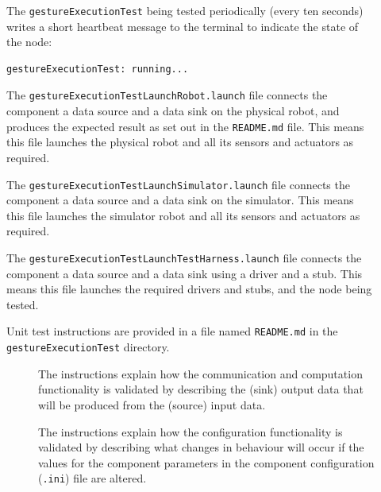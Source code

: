 \documentclass{CSSRforAfrica}
\newcommand{\checkboxChecked}{\fbox{\ding{51}}} %
\newcommand{\checkboxDashed}{\fbox{--}}         %
\begin{document}
\begin{description}
\item[\checkboxChecked]  The {\small \verb+gestureExecutionTest+} being tested periodically (every ten seconds) writes a short heartbeat message to
 the terminal to indicate the state of the node:
\begin{verbatim}
gestureExecutionTest: running...
\end{verbatim}

\item[\checkboxChecked] The {\small \verb+gestureExecutionTestLaunchRobot.launch+} file  connects the component a data source and a data sink on the physical robot, and produces the expected result as set out in the  {\small \verb+README.md+}  file.    This means this file launches the physical robot and all its sensors and actuators as required.

\item[\checkboxDashed] The {\small \verb+gestureExecutionTestLaunchSimulator.launch+} file  connects the component a data source and a data sink on the simulator.   This means this file launches the simulator robot and all its sensors and actuators as required.

\item[\checkboxChecked] The {\small \verb+gestureExecutionTestLaunchTestHarness.launch+} file  connects the component a data source and a data sink using a driver and a stub.   This means this file launches the required drivers and stubs, and the node being tested.

\item[\checkboxChecked] Unit test instructions are provided in a file named {\small \verb+README.md+} in the  {\small \verb+gestureExecutionTest+} directory. 


\begin{description}

\item[\checkboxChecked] The instructions explain how the communication and computation functionality is validated by describing the (sink) output data that will be produced from the (source) input data.  

\item[\checkboxChecked] The instructions explain how the configuration functionality is validated by describing what changes in behaviour will occur if the values for the component parameters in the component configuration ({\small \verb+.ini+}) file are altered.

\end{description}
\end{description}
\newpage
\end{document}
